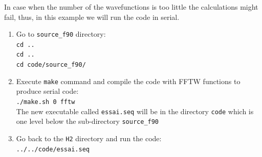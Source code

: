 \documentclass[10pt]{beamer}
\begin{document}
\begin{frame}
\frametitle{ }
In case when the number of the wavefunctions is too little the calculations might fail, thus, in this example we will run the code in serial. \\
\vspace*{0.4cm}
\begin{enumerate} 
\item Go to {\tt source\_f90} directory:\\
\vspace*{0.2cm}
{\tt cd ..}\\
{\tt cd ..}\\
{\tt cd code/source\_f90/}\\
\vspace*{0.2cm}
\item Execute {\tt make} command and compile the code with FFTW functions to produce serial code:\\
\vspace*{0.2cm}
{\tt ./make.sh 0 fftw}\\
\vspace*{0.2cm}
The new executable called {\tt essai.seq} will be in the directory {\tt code} which is one level below the sub-directory {\tt source\_f90}\\
\vspace*{0.4cm}
\item  Go back to the {\tt H2} directory and run the code:\\
\vspace*{0.2cm}
{\tt ../../code/essai.seq}\\
\vspace*{0.2cm}

\end{enumerate} 
 

   
\end{frame}


\end{document}
